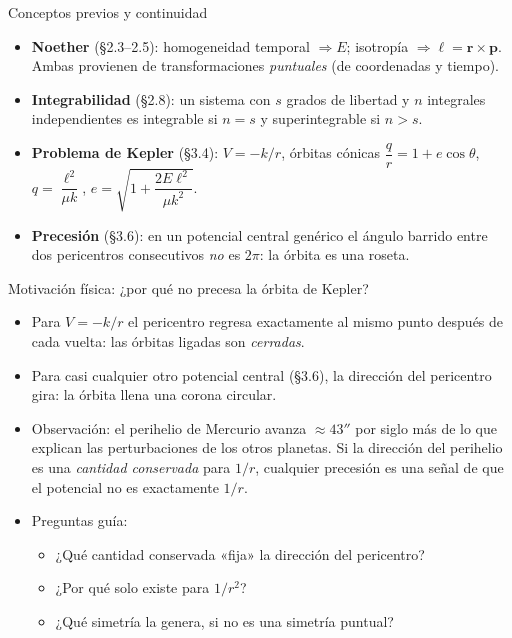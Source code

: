 \documentclass[aspectratio=169]{beamer}
\newcommand{\vr}{\mathbf r}
\newcommand{\vp}{\mathbf p}
\newcommand{\vl}{\boldsymbol\ell}
\begin{document}
\begin{frame}{Conceptos previos y continuidad}
\begin{itemize}
  \item<1-> \textbf{Noether} (§2.3–2.5): homogeneidad temporal $\Rightarrow E$;
        isotropía $\Rightarrow \vl=\vr\times\vp$. Ambas provienen de transformaciones
        \emph{puntuales} (de coordenadas y tiempo).
  \item<2-> \textbf{Integrabilidad} (§2.8): un sistema con $s$ grados de libertad y $n$
        integrales independientes es integrable si $n=s$ y superintegrable si $n>s$.
  \item<3-> \textbf{Problema de Kepler} (§3.4): $V=-k/r$, órbitas cónicas
        $\dfrac{q}{r}=1+e\cos\theta$, \; $q=\dfrac{\ell^{2}}{\mu k}$, \;
        $e=\sqrt{1+\dfrac{2E\ell^{2}}{\mu k^{2}}}$.
  \item<4-> \textbf{Precesión} (§3.6): en un potencial central genérico el ángulo barrido
        entre dos pericentros consecutivos \emph{no} es $2\pi$: la órbita es una roseta.
\end{itemize}
\end{frame}

\begin{frame}{Motivación física: ¿por qué no precesa la órbita de Kepler?}
\begin{itemize}
  \item<1-> Para $V=-k/r$ el pericentro regresa exactamente al mismo punto después de cada
        vuelta: las órbitas ligadas son \emph{cerradas}.
  \item<2-> Para casi cualquier otro potencial central (§3.6), la dirección del pericentro
        gira: la órbita llena una corona circular.
  \item<3-> Observación: el perihelio de Mercurio avanza $\approx43''$ por siglo más de lo que
        explican las perturbaciones de los otros planetas. Si la dirección del
        perihelio es una \emph{cantidad conservada} para $1/r$, cualquier precesión es una
        señal de que el potencial no es exactamente $1/r$.
  \item<4-> Preguntas guía:
  \begin{itemize}
    \item ¿Qué cantidad conservada «fija» la dirección del pericentro?
    \item ¿Por qué solo existe para $1/r^{2}$?
    \item ¿Qué simetría la genera, si no es una simetría puntual?
  \end{itemize}
\end{itemize}
\end{frame}
\end{document}
